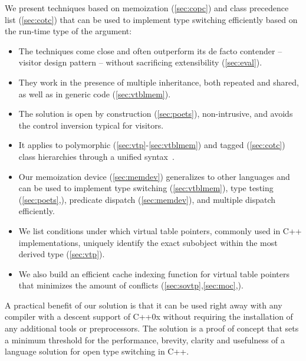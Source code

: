 We present techniques based on memoization (\textsection\ref{sec:copc}) and 
class precedence list (\textsection\ref{sec:cotc}) that can be used to
implement type switching efficiently based on the run-time type of the
argument:
  \begin{itemize}
  \setlength{\itemsep}{0pt}
  \setlength{\parskip}{0pt}
  \item The techniques come close and often outperform its de facto contender -- 
        visitor design pattern -- without sacrificing extensibility (\textsection\ref{sec:eval}).
  \item They work in the presence of multiple inheritance, both repeated and 
  shared, as well as in generic code (\textsection\ref{sec:vtblmem}).
  \item The solution is open by construction (\textsection\ref{sec:poets}), 
        non-intrusive, and avoids the control inversion typical for visitors.
  \item It applies to polymorphic (\textsection\ref{sec:vtp}-\ref{sec:vtblmem}) and 
        tagged (\textsection\ref{sec:cotc}) class hierarchies through a unified  
        syntax~\cite[]{TR}.
  \item Our memoization device (\textsection\ref{sec:memdev}) generalizes to 
        other languages and can be used to implement type switching 
        (\textsection\ref{sec:vtblmem}), type testing 
        (\textsection\ref{sec:poets},\cite[]{TR}), predicate dispatch 
        (\textsection\ref{sec:memdev}), and multiple dispatch efficiently.
  \item We list conditions under which virtual table pointers, commonly used in 
        C++ implementations, uniquely identify the exact subobject within the 
        most derived type (\textsection\ref{sec:vtp}).
  \item We also build an efficient cache indexing function for virtual table 
        pointers that minimizes the amount of conflicts 
        (\textsection\ref{sec:sovtp},\ref{sec:moc},\cite[.2]{TR}).
  \end{itemize}

\noindent
A practical benefit of our solution is that it can be used right away with any 
compiler with a descent support of C++0x without requiring the installation of 
any additional tools or preprocessors. The solution is a proof of concept that 
sets a minimum threshold for the performance, brevity, clarity and usefulness of 
a language solution for open type switching in C++.

